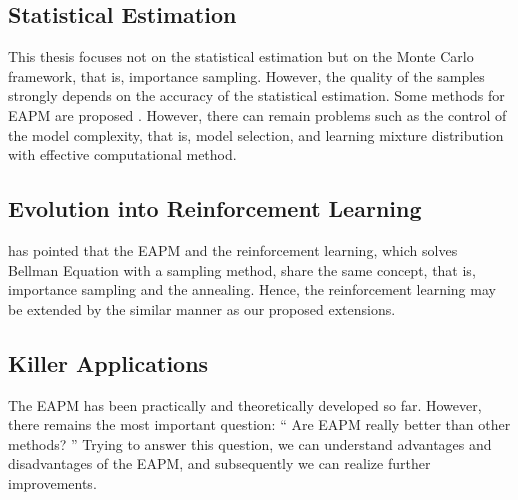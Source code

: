 \subsection{Statistical Estimation}
This thesis focuses not on the statistical estimation
but on the Monte Carlo framework, that is, importance sampling.
However, the quality of the samples strongly depends on
the accuracy of the statistical estimation.
Some methods for EAPM are proposed \cite{larranaga:eda}.
However, there can remain problems such as
the control of the model complexity, that is, model selection, and
learning mixture distribution with effective computational method.



\subsection{Evolution into Reinforcement Learning}
\cite{rubinstein:ce} has pointed that
the EAPM and
the reinforcement learning,
which solves Bellman Equation with a sampling method,
share the same concept,
that is, importance sampling and the annealing.
Hence, the reinforcement learning may be
extended by the similar manner as our proposed extensions.


\subsection{Killer Applications}
The EAPM has been practically and theoretically developed so far.
However, there remains the most important question:
``
Are EAPM really better than other methods?
''
Trying to answer this question, we can understand 
advantages and disadvantages of the EAPM,
and subsequently we can realize further improvements.